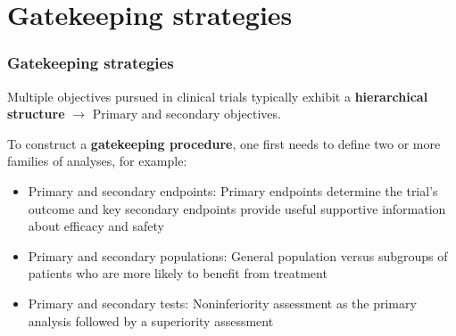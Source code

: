 \documentclass[xcolor={pdftex,dvipsnames,table}]{beamer}
\newcommand{\rbf}[1]{\textcolor{redUnipd}{ #1}}
\begin{document}
\begin{frame}
\begin{center}
\end{center}
\end{frame}

\section{Gatekeeping strategies}

\begin{frame}
\frametitle{Gatekeeping strategies}
Multiple objectives pursued in clinical trials typically exhibit a \textbf{hierarchical structure} $\rightarrow$ Primary and secondary objectives.

\bigskip

To construct a \textbf{gatekeeping procedure}, one first needs to define two or
more families of analyses, for example:
\begin{itemize}
    \item \rbf{Primary and secondary endpoints}: Primary endpoints determine the trial's outcome and key secondary endpoints provide useful supportive information about efficacy and safety
    \item \rbf{Primary and secondary populations}: General population versus subgroups of patients who are more likely to benefit from treatment
    \item \rbf{Primary and secondary tests}: Noninferiority assessment as the primary analysis followed by a superiority assessment
\end{itemize}


\end{frame}
\end{document}
